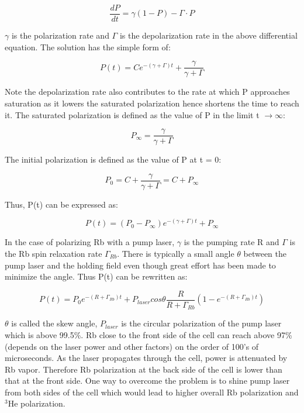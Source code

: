 \begin{equation}
\frac{dP}{dt}=\gamma(1-P)-\Gamma \cdot P
\end{equation}

$\gamma$ is the polarization rate and $\Gamma$ is the depolarization rate in the above differential equation. The solution has the simple form of:

\begin{equation}
P(t)=Ce^{-(\gamma+\Gamma)t} + \frac{\gamma}{\gamma+\Gamma}
\end{equation}

Note the depolarization rate also contributes to the rate at which P approaches saturation as it lowers the saturated polarization hence shortens the time to reach it. The saturated polarization is defined as the value of P in the limit t $\rightarrow \infty$:

\begin{equation}
P_{\infty}=\frac{\gamma}{\gamma+\Gamma}
\end{equation}

The initial polarization is defined as the value of P at t = 0:

\begin{equation}
P_{0}=C+\frac{\gamma}{\gamma+\Gamma}=C+P_{\infty}
\end{equation}

Thus, P(t) can be expressed as:

\begin{equation}
P(t)=(P_{0}-P_{\infty})e^{-(\gamma+\Gamma)t}+P_{\infty}
\end{equation}

In the case of polarizing Rb with a pump laser, $\gamma$ is the pumping rate R and $\Gamma$ is the Rb spin relaxation rate $\Gamma_{Rb}$. There is typically a small angle $\theta$ between the pump laser and the holding field even though great effort has been made to minimize the angle. Thus P(t) can be rewritten as:

\begin{equation}\label{Pt}
P(t) = P_{0}e^{-(R+\Gamma_{Rb})t} + P_{laser}cos\theta \frac{R}{R+\Gamma_{Rb}}(1-e^{-(R+\Gamma_{Rb})t})
\end{equation}

$\theta$ is called the skew angle, $P_{laser}$ is the circular polarization of the pump laser which is above 99.5\%. Rb close to the front side of the cell can reach above 97\% (depends on the laser power and other factors) on the order of 100's of microseconds. As the laser propagates through the cell, power is attenuated by Rb vapor. Therefore Rb polarization at the back side of the cell is lower than that at the front side. One way to overcome the problem is to shine pump laser from both sides of the cell which would lead to higher overall Rb polarization and $^{3}$He polarization.

